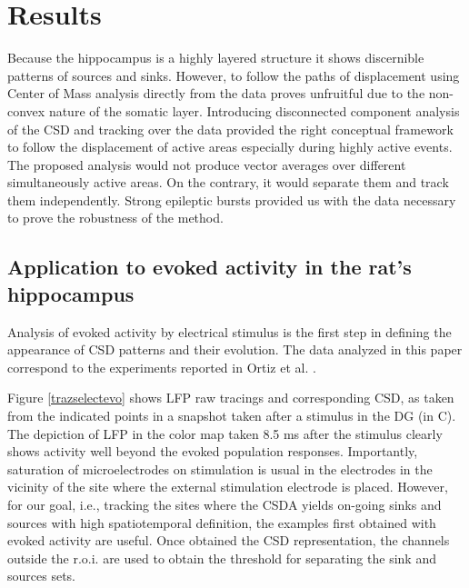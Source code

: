 \documentclass[letterpaper,12pts]{article}
\begin{document}
 
\section{Results}


Because the hippocampus is a highly layered structure it shows discernible patterns of sources and sinks. However, to follow the paths of displacement using Center of Mass analysis directly from the data proves unfruitful due to the non-convex nature of the somatic layer. Introducing disconnected component analysis of the CSD and tracking over the data provided the right conceptual framework to follow the displacement of active areas especially during highly active events. The proposed analysis would not produce vector averages over different simultaneously active areas. On the contrary, it would separate them and track them independently. Strong epileptic bursts provided us with the data necessary to prove the robustness of the method. 

\subsection{Application to evoked activity in the rat's hippocampus}\label{sec:evocada}

Analysis of evoked activity by electrical stimulus is the first step in defining the appearance of CSD patterns and their evolution. The data analyzed in this paper correspond to the experiments reported in Ortiz et al. \cite{Franco2018}.

Figure \ref{trazselectevo}  shows LFP raw tracings and corresponding CSD, as taken from the indicated points in a snapshot taken after a stimulus in the DG (in C). The depiction of LFP in the color map taken 8.5 ms after the stimulus clearly shows activity well beyond the evoked population responses. Importantly, saturation of microelectrodes on stimulation is usual in the electrodes in the vicinity of the site where the external stimulation electrode is placed. However, for our goal, i.e., tracking the sites where the CSDA yields on-going sinks and sources with high spatiotemporal definition, the examples first obtained with evoked activity are useful. Once obtained the CSD representation, the channels outside the r.o.i. are used to obtain the threshold for separating the sink and sources sets. 
\end{document}
